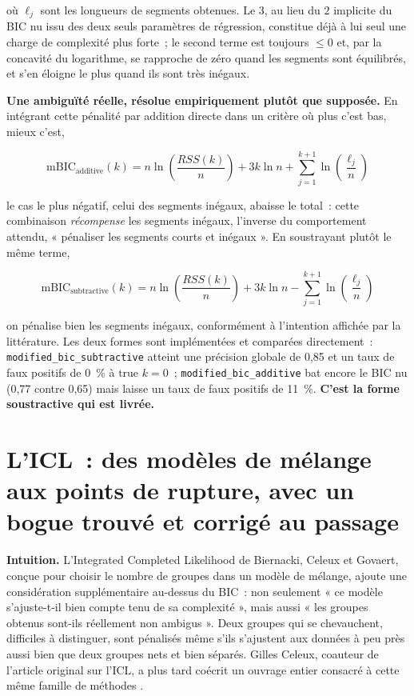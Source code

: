 \documentclass[11pt]{article}
\newcommand{\code}[1]{\texttt{#1}}
\begin{document}
où $\ell_j$ sont les longueurs de segments obtenues. Le $3$, au lieu du $2$
implicite du BIC nu issu des deux seuls paramètres de régression,
constitue déjà à lui seul une charge de complexité plus forte~; le second
terme est toujours $\le 0$ et, par la concavité du logarithme, se
rapproche de zéro quand les segments sont équilibrés, et s'en éloigne le
plus quand ils sont très inégaux.

\textbf{Une ambiguïté réelle, résolue empiriquement plutôt que supposée.}
En intégrant cette pénalité par addition directe dans un critère où plus
c'est bas, mieux c'est,

\begin{equation}
\mathrm{mBIC}_{\text{additive}}(k) = n \ln\!\left(\frac{RSS(k)}{n}\right) + 3k \ln n + \sum_{j=1}^{k+1} \ln\!\left(\frac{\ell_j}{n}\right)
\end{equation}

le cas le plus négatif, celui des segments inégaux, abaisse le total~:
cette combinaison \emph{récompense} les segments inégaux, l'inverse du
comportement attendu, « pénaliser les segments courts et inégaux ». En
soustrayant plutôt le même terme,

\begin{equation}
\mathrm{mBIC}_{\text{subtractive}}(k) = n \ln\!\left(\frac{RSS(k)}{n}\right) + 3k \ln n - \sum_{j=1}^{k+1} \ln\!\left(\frac{\ell_j}{n}\right)
\end{equation}

on pénalise bien les segments inégaux, conformément à l'intention affichée
par la littérature. Les deux formes sont implémentées et comparées
directement~: \code{modified\_bic\_subtractive} atteint une précision
globale de 0,85 et un taux de faux positifs de 0~\% à $\text{true } k = 0$~;
\code{modified\_bic\_additive} bat encore le BIC nu (0,77 contre 0,65) mais
laisse un taux de faux positifs de 11~\%. \textbf{C'est la forme
soustractive qui est livrée.}

\section{L'ICL~: des modèles de mélange aux points de rupture, avec un bogue trouvé et corrigé au passage}

\textbf{Intuition.} L'Integrated Completed Likelihood de Biernacki, Celeux
et Govaert, conçue pour choisir le nombre de groupes dans un modèle de
mélange, ajoute une considération supplémentaire au-dessus du BIC~: non
seulement « ce modèle s'ajuste-t-il bien compte tenu de sa complexité »,
mais aussi « les groupes obtenus sont-ils réellement non ambigus ». Deux
groupes qui se chevauchent, difficiles à distinguer, sont pénalisés même
s'ils s'ajustent aux données à peu près aussi bien que deux groupes nets et
bien séparés. Gilles Celeux, coauteur de l'article original sur l'ICL, a
plus tard coécrit un ouvrage entier consacré à cette même famille de
méthodes \citep{bouveyron2021mbc}.
\end{document}
